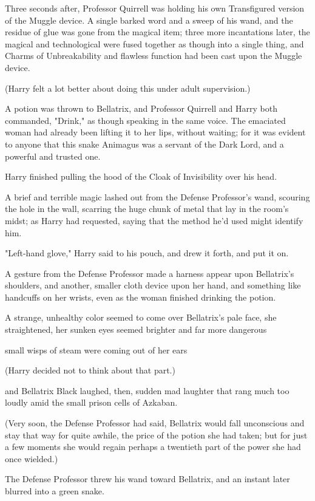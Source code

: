 Three seconds after, Professor Quirrell was holding his own Transfigured
version of the Muggle device. A single barked word and a sweep of his wand, and
the residue of glue was gone from the magical item; three more incantations
later, the magical and technological were fused together as though into a
single thing, and Charms of Unbreakability and flawless function had been cast
upon the Muggle device.

(Harry felt a lot better about doing this under adult supervision.)

A potion was thrown to Bellatrix, and Professor Quirrell and Harry both
commanded, "Drink," as though speaking in the same voice. The emaciated woman
had already been lifting it to her lips, without waiting; for it was evident to
anyone that this snake Animagus was a servant of the Dark Lord, and a powerful
and trusted one.

Harry finished pulling the hood of the Cloak of Invisibility over his head.

A brief and terrible magic lashed out from the Defense Professor's wand,
scouring the hole in the wall, scarring the huge chunk of metal that lay in the
room's midst; as Harry had requested, saying that the method he'd used might
identify him.

"Left-hand glove," Harry said to his pouch, and drew it forth, and put it on.

A gesture from the Defense Professor made a harness appear upon Bellatrix's
shoulders, and another, smaller cloth device upon her hand, and something like
handcuffs on her wrists, even as the woman finished drinking the potion.

A strange, unhealthy color seemed to come over Bellatrix's pale face, she
straightened, her sunken eyes seemed brighter and far more dangerous{\el}

{\el} small wisps of steam were coming out of her ears{\el}

(Harry decided not to think about that part.)

{\el} and Bellatrix Black laughed, then, sudden mad laughter that rang much
too loudly amid the small prison cells of Azkaban.

(Very soon, the Defense Professor had said, Bellatrix would fall unconscious
and stay that way for quite awhile, the price of the potion she had taken; but
for just a few moments she would regain perhaps a twentieth part of the power
she had once wielded.)

The Defense Professor threw his wand toward Bellatrix, and an instant later
blurred into a green snake.

